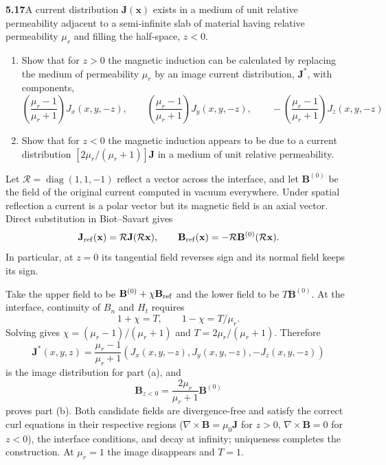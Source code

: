 \par\bigskip
\noindent\textbf{5.17}\quad A current distribution $\mathbf{J}(\mathbf{x})$ exists in a medium of unit relative permeability adjacent to a semi-infinite slab of material having relative permeability $\mu_{r}$ and filling the half-space, $z<0$.
\begin{enumerate}
\item[(a)] Show that for $z>0$ the magnetic induction can be calculated by replacing the medium of permeability $\mu_{r}$ by an image current distribution, $\mathbf{J}^{*}$, with components,
\[
\left(\frac{\mu_{r}-1}{\mu_{r}+1}\right)\!J_{x}(x,y,-z),\qquad
\left(\frac{\mu_{r}-1}{\mu_{r}+1}\right)\!J_{y}(x,y,-z),\qquad
-\left(\frac{\mu_{r}-1}{\mu_{r}+1}\right)\!J_{z}(x,y,-z)
\]
\item[(b)] Show that for $z<0$ the magnetic induction appears to be due to a current distribution $[2\mu_{r}/(\mu_{r}+1)]\mathbf{J}$ in a medium of unit relative permeability.
\end{enumerate}
\solution
Let $\mathcal R=\operatorname{diag}(1,1,-1)$ reflect a vector across
the interface, and let $\mathbf B^{(0)}$ be the field of the original
current computed in vacuum everywhere.
Under spatial reflection a current is a polar vector but its magnetic
field is an axial vector. Direct substitution in Biot--Savart gives
\[
\mathbf J_{\rm ref}(\mathbf x)=\mathcal R\mathbf J(\mathcal R\mathbf x),
\qquad
\mathbf B_{\rm ref}(\mathbf x)=-\mathcal R\mathbf B^{(0)}(\mathcal R\mathbf x).
\]
In particular, at $z=0$ its tangential field reverses sign and its
normal field keeps its sign.

Take the upper field to be $\mathbf B^{(0)}+\chi\mathbf B_{\rm ref}$
and the lower field to be $T\mathbf B^{(0)}$. At the interface,
continuity of $B_n$ and $H_t$ requires
\[
1+\chi=T,\qquad 1-\chi=T/\mu_r.
\]
Solving gives $\chi=(\mu_r-1)/(\mu_r+1)$ and
$T=2\mu_r/(\mu_r+1)$.
Therefore
\[
\boxed{\mathbf J^*(x,y,z)=\frac{\mu_r-1}{\mu_r+1}
(J_x(x,y,-z),J_y(x,y,-z),-J_z(x,y,-z))}
\]
is the image distribution for part (a), and
\[
\boxed{\mathbf B_{z<0}=\frac{2\mu_r}{\mu_r+1}\mathbf B^{(0)}}
\]
proves part (b). Both candidate fields are divergence-free and satisfy
the correct curl equations in their respective regions
($\nabla\times\mathbf B=\mu_0\mathbf J$ for $z>0$, $\nabla\times\mathbf B=0$ for $z<0$),
the interface conditions, and decay at infinity; uniqueness completes
the construction. At $\mu_r=1$ the image disappears and $T=1$.


